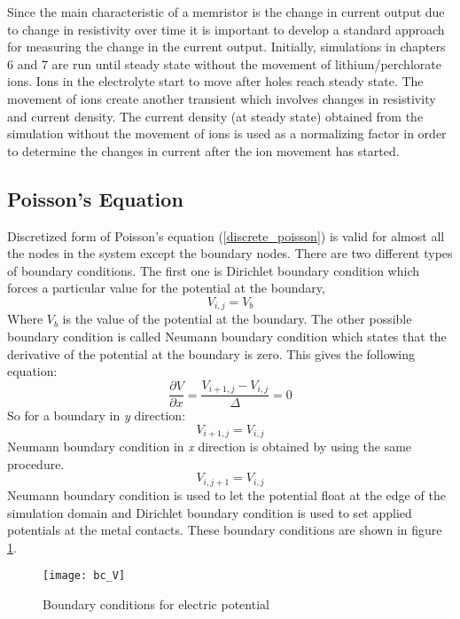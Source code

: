 \begin{doublespace}
Since the main characteristic of a memristor is the change in current output due to change in resistivity over time it is important to develop a standard approach for measuring the change in the current output. Initially, simulations in chapters 6 and 7 are run until steady state without the movement of lithium/perchlorate ions. Ions in the electrolyte start to move after holes reach steady state. The movement of ions create another transient which involves changes in resistivity and current density. The current density (at steady state) obtained from the simulation without the movement of ions is used as a normalizing factor in order to determine the changes in current after the ion movement has started.

\subsection{Poisson's Equation}
Discretized form of Poisson's equation (\ref{discrete_poisson}) is valid for almost all the nodes in the system except the boundary nodes. There are two different types of boundary conditions. The first one is  Dirichlet boundary condition which forces a particular value for the potential at the boundary\cite{ODEtxtbk},
\begin{equation}
V_{i,j}=V_{b}
\label{dirichlet}
\end{equation}
Where $V_{b}$ is the value of the potential at the boundary. The other possible boundary condition is called  Neumann boundary condition which states that the derivative of the potential at the boundary is zero\cite{ODEtxtbk}. This gives the following equation:
\begin{equation}
\frac{\partial V}{\partial x}=\frac{V_{i+1,j}-V_{i,j}}{\Delta}=0
\label{neumannx}
\end{equation}
So for a boundary in \textit{y} direction:
\begin{equation}
V_{i+1,j}=V_{i,j}
\label{neumanny}
\end{equation}
 Neumann boundary condition in \textit{x} direction is obtained by using the same procedure.
\begin{equation}
V_{i,j+1}=V_{i,j}
\end{equation}
Neumann boundary condition is used to let the potential float at the edge of the simulation domain and Dirichlet boundary condition is used to set applied potentials at the metal contacts. These boundary conditions are shown in figure \ref{bc_V}.

\begin{figure}[!htp]
\centering
\texttt{[image: bc\_V]}
\caption{Boundary conditions for electric potential } 
\label{bc_V}
\end{figure}


\end{doublespace}
